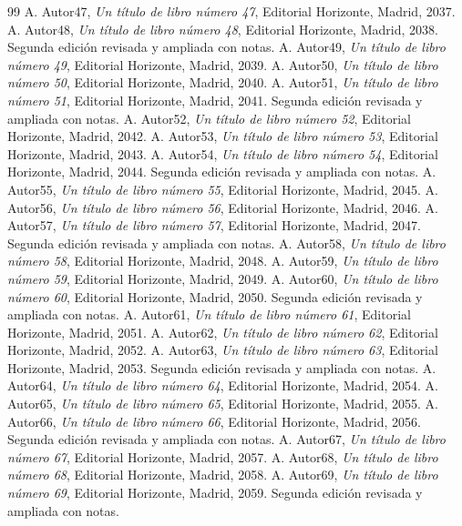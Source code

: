 \documentclass{article}
\begin{document}
\begin{thebibliography}{99}
 A. Autor47, \emph{Un título de libro número 47}, Editorial Horizonte, Madrid, 2037.
 A. Autor48, \emph{Un título de libro número 48}, Editorial Horizonte, Madrid, 2038. Segunda edición revisada y ampliada con notas.
 A. Autor49, \emph{Un título de libro número 49}, Editorial Horizonte, Madrid, 2039.
 A. Autor50, \emph{Un título de libro número 50}, Editorial Horizonte, Madrid, 2040.
 A. Autor51, \emph{Un título de libro número 51}, Editorial Horizonte, Madrid, 2041. Segunda edición revisada y ampliada con notas.
 A. Autor52, \emph{Un título de libro número 52}, Editorial Horizonte, Madrid, 2042.
 A. Autor53, \emph{Un título de libro número 53}, Editorial Horizonte, Madrid, 2043.
 A. Autor54, \emph{Un título de libro número 54}, Editorial Horizonte, Madrid, 2044. Segunda edición revisada y ampliada con notas.
 A. Autor55, \emph{Un título de libro número 55}, Editorial Horizonte, Madrid, 2045.
 A. Autor56, \emph{Un título de libro número 56}, Editorial Horizonte, Madrid, 2046.
 A. Autor57, \emph{Un título de libro número 57}, Editorial Horizonte, Madrid, 2047. Segunda edición revisada y ampliada con notas.
 A. Autor58, \emph{Un título de libro número 58}, Editorial Horizonte, Madrid, 2048.
 A. Autor59, \emph{Un título de libro número 59}, Editorial Horizonte, Madrid, 2049.
 A. Autor60, \emph{Un título de libro número 60}, Editorial Horizonte, Madrid, 2050. Segunda edición revisada y ampliada con notas.
 A. Autor61, \emph{Un título de libro número 61}, Editorial Horizonte, Madrid, 2051.
 A. Autor62, \emph{Un título de libro número 62}, Editorial Horizonte, Madrid, 2052.
 A. Autor63, \emph{Un título de libro número 63}, Editorial Horizonte, Madrid, 2053. Segunda edición revisada y ampliada con notas.
 A. Autor64, \emph{Un título de libro número 64}, Editorial Horizonte, Madrid, 2054.
 A. Autor65, \emph{Un título de libro número 65}, Editorial Horizonte, Madrid, 2055.
 A. Autor66, \emph{Un título de libro número 66}, Editorial Horizonte, Madrid, 2056. Segunda edición revisada y ampliada con notas.
 A. Autor67, \emph{Un título de libro número 67}, Editorial Horizonte, Madrid, 2057.
 A. Autor68, \emph{Un título de libro número 68}, Editorial Horizonte, Madrid, 2058.
 A. Autor69, \emph{Un título de libro número 69}, Editorial Horizonte, Madrid, 2059. Segunda edición revisada y ampliada con notas.
\end{thebibliography}
\end{document}
